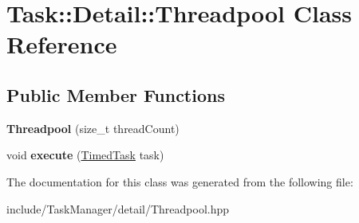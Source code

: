 \hypertarget{classTask_1_1Detail_1_1Threadpool}{}\section{Task\+:\+:Detail\+:\+:Threadpool Class Reference}
\label{classTask_1_1Detail_1_1Threadpool}
\subsection*{Public Member Functions}
\begin{DoxyCompactItemize}
\item 
\mbox{\label{classTask_1_1Detail_1_1Threadpool_aeb9a8c7ee6d72b9fa7294eb86340f133}} 
{\bfseries Threadpool} (size\+\_\+t thread\+Count)
\item 
\mbox{\label{classTask_1_1Detail_1_1Threadpool_a11897665b92483387fa1b5eb2b719b48}} 
void {\bfseries execute} (\hyperlink{classTask_1_1Detail_1_1TimedTask}{Timed\+Task} task)
\end{DoxyCompactItemize}


The documentation for this class was generated from the following file\+:\begin{DoxyCompactItemize}
\item 
include/\+Task\+Manager/detail/Threadpool.\+hpp\end{DoxyCompactItemize}

